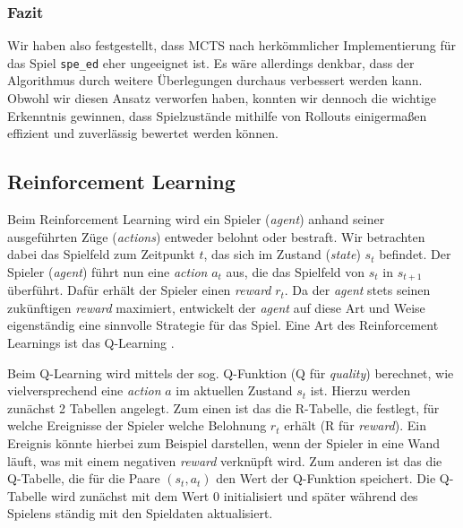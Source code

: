 \documentclass[12pt,a4paper]{article}
\begin{document}
\subsubsection{Fazit} 
Wir haben also festgestellt, dass MCTS nach herkömmlicher Implementierung für das Spiel \texttt{spe\_ed} eher ungeeignet ist. Es wäre allerdings denkbar, dass der Algorithmus durch weitere Überlegungen durchaus verbessert werden kann. Obwohl wir diesen Ansatz verworfen haben, konnten wir dennoch die wichtige Erkenntnis gewinnen, dass Spielzustände mithilfe von Rollouts einigermaßen effizient und zuverlässig bewertet werden können.

\subsection{Reinforcement Learning}
Beim Reinforcement Learning wird ein Spieler (\textit{agent}) anhand seiner ausgeführten Züge (\textit{actions}) entweder belohnt oder bestraft. Wir betrachten dabei das Spielfeld zum Zeitpunkt $t$, das sich im Zustand (\textit{state}) $s_t$ befindet. Der Spieler (\textit{agent}) führt nun eine \textit{action} $a_t$ aus, die das Spielfeld von $s_t$ in $s_{t+1}$ überführt. Dafür erhält der Spieler einen \textit{reward} $r_t$. Da der \textit{agent} stets seinen zukünftigen \textit{reward} maximiert, entwickelt der \textit{agent} auf diese Art und Weise eigenständig eine sinnvolle Strategie für das Spiel. Eine Art des Reinforcement Learnings ist das Q-Learning \cite{schwaiger2019}.

Beim Q-Learning wird mittels der sog. Q-Funktion (Q für \textit{quality}) berechnet, wie vielversprechend eine \textit{action} $a$ im aktuellen Zustand $s_t$ ist. Hierzu werden zunächst 2 Tabellen angelegt. Zum einen ist das die R-Tabelle, die festlegt, für welche Ereignisse der Spieler welche Belohnung $r_t$ erhält (R für \textit{reward}). Ein Ereignis könnte hierbei zum Beispiel darstellen, wenn der Spieler in eine Wand läuft, was mit einem negativen \textit{reward} verknüpft wird. Zum anderen ist das die Q-Tabelle, die für die Paare $(s_t, a_t)$ den Wert der Q-Funktion speichert. Die Q-Tabelle wird zunächst mit dem Wert 0 initialisiert und später während des Spielens ständig mit den Spieldaten aktualisiert.
\end{document}
